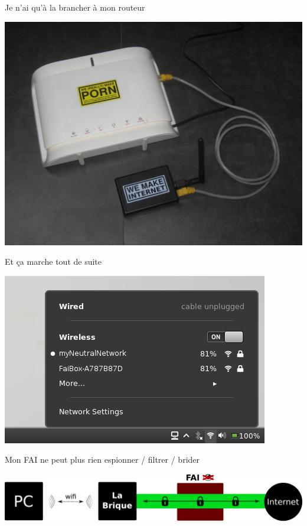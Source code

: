 \documentclass[notes=hide]{beamer}
\begin{document}
\begin{frame}[t]{Je n'ai qu'à la brancher à mon routeur}
\begin{center}
\vfill
\includegraphics[width=.75\textwidth]{img/05-photo-neufboxboitier.jpg}
\vfill
\end{center}
\end{frame}

\begin{frame}[t]{Et ça marche tout de suite}
\begin{center}
\vfill
\includegraphics[width=.8\textwidth]{img/06-capture-wifiboitier.png}
\vfill
\end{center}
\end{frame}

\begin{frame}[t]{Mon FAI ne peut plus rien espionner / filtrer / brider}
\begin{center}
\vfill
\includegraphics[width=.9\textwidth]{img/07-schema-connexionboitier.pdf}
\vfill
\end{center}
\end{frame}
\end{document}
